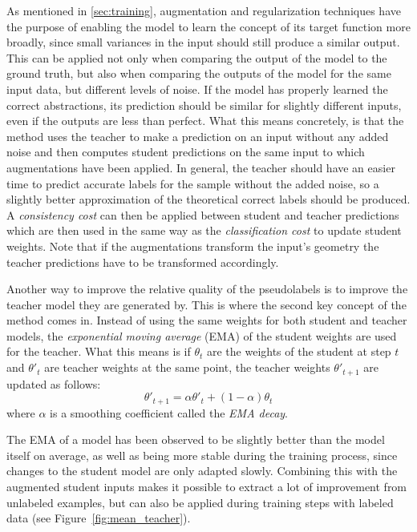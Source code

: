 As mentioned in \ref{sec:training}, augmentation and regularization techniques have the purpose of enabling the model to learn the concept of its target function more broadly, since small variances in the input should still produce a similar output. 
This can be applied not only when comparing the output of the model to the ground truth, but also when comparing the outputs of the model for the same input data, but different levels of noise. 
If the model has properly learned the correct abstractions, its prediction should be similar for slightly different inputs, even if the outputs are less than perfect.
What this means concretely, is that the method uses the teacher to make a prediction on an input without any added noise and then computes student predictions on the same input to which augmentations have been applied.
In general, the teacher should have an easier time to predict accurate labels for the sample without the added noise, so a slightly better approximation of the theoretical correct labels should be produced. 
A \emph{consistency cost} can then be applied between student and teacher predictions which are then used in the same way as the \emph{classification cost} to update student weights.
Note that if the augmentations transform the input's geometry the teacher predictions have to be transformed accordingly.

Another way to improve the relative quality of the pseudolabels is to improve the teacher model they are generated by.
This is where the second key concept of the method comes in.
Instead of using the same weights for both student and teacher models, the \emph{exponential moving average} (EMA) of the student weights are used for the teacher.
What this means is if $\theta_t$ are the weights of the student at step $t$ and $\theta'_t$ are teacher weights at the same point, the teacher weights $\theta'_{t+1}$ are updated as follows:
$$
    \theta'_{t + 1} = \alpha\theta'_t + (1 - \alpha) \theta_t
$$
where $\alpha$ is a smoothing coefficient called the \emph{EMA decay}.

The EMA of a model has been observed to be slightly better than the model itself on average, as well as being more stable during the training process, since changes to the student model are only adapted slowly. Combining this with the augmented student inputs makes it possible to extract a lot of improvement from unlabeled examples, but can also be applied during training steps with labeled data (see Figure~\ref{fig:mean_teacher}). 

